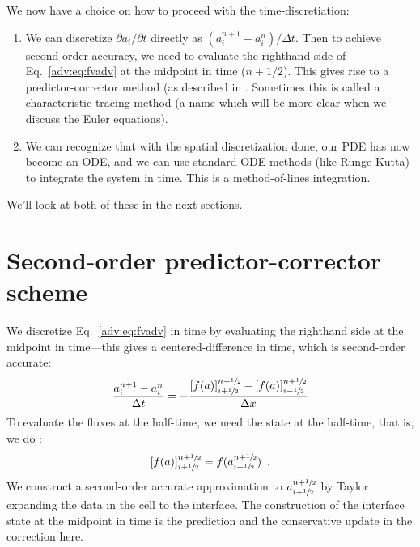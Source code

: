 We now have a choice on how to proceed with the time-discretiation:
\begin{enumerate}
\item We can discretize ${\partial a_i}/{\partial t}$ directly as
  $(a_i^{n+1} - a_i^n)/\Delta t$.  Then to achieve second-order
  accuracy, we need to evaluate the righthand side of
  Eq.~\ref{adv:eq:fvadv} at the midpoint in time ($n+1/2$).  This
  gives rise to a predictor-corrector method (as described in
  \cite{colella:1990}.  Sometimes this is called a characteristic
  tracing method (a name which will be more clear when we discuss the
  Euler equations).

\item We can recognize that with the spatial discretization done, our
  PDE has now become an ODE, and we can use standard ODE methods (like
  Runge-Kutta) to integrate the system in time.  This is a method-of-lines
  integration.

\end{enumerate}

We'll look at both of these in the next sections.


\section{Second-order predictor-corrector scheme}

We discretize Eq.~\ref{adv:eq:fvadv} in time by evaluating the
righthand side at the midpoint in time---this gives a
centered-difference in time, which is second-order accurate:
\begin{equation}
\frac{a_i^{n+1} - a_i^n}{\Delta t} = -\frac{\left [f(a) \right ]_{i+{\sfrac{1}{2}}}^{n+{\sfrac{1}{2}}} - \left [f(a) \right ]_{i-{\sfrac{1}{2}}}^{n+{\sfrac{1}{2}}}}{\Delta x}
\label{eq:consupdate1d}
\end{equation}
To evaluate the fluxes at the half-time, we need the state at the
half-time, that is, we do :
\begin{equation}
\label{adv:eq:fluxeval}
\left [f(a) \right ]_{i+{\sfrac{1}{2}}}^{n+{\sfrac{1}{2}}} = f(a_{i+{\sfrac{1}{2}}}^{n+{\sfrac{1}{2}}}) \enskip .
\end{equation}
We construct a second-order accurate approximation to
$a_{i+{\sfrac{1}{2}}}^{n+{\sfrac{1}{2}}}$ by Taylor expanding the data in the cell
to the interface.  The construction of the interface state at the
midpoint in time is the prediction and the conservative update in the
correction here.

